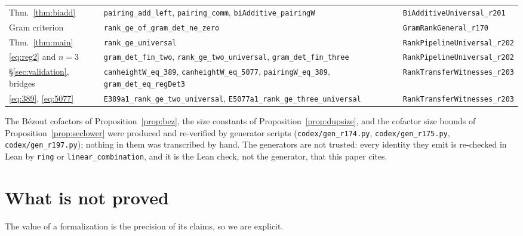 \documentclass[11pt,reqno]{amsart}
\theoremstyle{plain}
\theoremstyle{definition}
\theoremstyle{remark}
\DeclareRobustCommand{\lt}[1]{\texttt{#1}}
\begin{document}
\begin{longtable}{@{}p{}p{}p{}@{}}
Thm.~\ref{thm:biadd}
  & \lt{pairing\_add\_left}, \lt{pairing\_comm},\newline
    \lt{biAdditive\_pairingW}
  & \lt{BiAdditiveUniversal\_r201}\\
Gram criterion
  & \lt{rank\_ge\_of\_gram\_det\_ne\_zero}
  & \lt{GramRankGeneral\_r170}\\
Thm.~\ref{thm:main}
  & \lt{rank\_ge\_universal}
  & \lt{RankPipelineUniversal\_r202}\\
\eqref{eq:reg2} and $n=3$
  & \lt{gram\_det\_fin\_two},\newline
    \lt{rank\_ge\_two\_universal},\newline
    \lt{gram\_det\_fin\_three}
  & \lt{RankPipelineUniversal\_r202}\\
\S\ref{sec:validation}, bridges
  & \lt{canheightW\_eq\_389},\newline
    \lt{canheightW\_eq\_5077},\newline
    \lt{pairingW\_eq\_389}, \lt{gram\_det\_eq\_regDet3}
  & \lt{RankTransferWitnesses\_r203}\\
\eqref{eq:389}, \eqref{eq:5077}
  & \lt{E389a1\_rank\_ge\_two\_universal},\newline
    \lt{E5077a1\_rank\_ge\_three\_universal}
  & \lt{RankTransferWitnesses\_r203}\\
\end{longtable}
\endgroup

The B\'ezout cofactors of Proposition~\ref{prop:bez}, the size constants
of Proposition~\ref{prop:dupsize}, and the cofactor size bounds of
Proposition~\ref{prop:seclower} were produced and re-verified by
generator scripts (\lt{codex/gen\_r174.py}, \lt{codex/gen\_r175.py},
\lt{codex/gen\_r197.py}); nothing in them was transcribed by hand. The
generators are not trusted: every identity they emit is re-checked in
Lean by \lt{ring} or \lt{linear\_combination}, and it is the Lean check,
not the generator, that this paper cites.

\section{What is not proved}\label{sec:notproved}

The value of a formalization is the precision of its claims, so we are
explicit.
\end{document}
